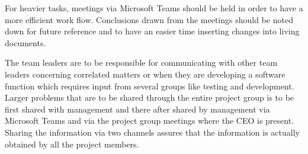 For heavier tasks, meetings via Microsoft Teams should be held in order to have a more efficient work flow. Conclusions drawn from the meetings should be noted down for future reference and to have an easier time inserting changes into living documents.

The team leaders are to be responsible for communicating with other team leaders concerning correlated matters or when they are developing a software function which requires input from several groups like testing and development. Larger problems that are to be shared through the entire project group is to be first shared with management and there after shared by management via Microsoft Teams and via the project group meetings where the CEO is present. Sharing the information via two channels assures that the information is actually obtained by all the project members. 
